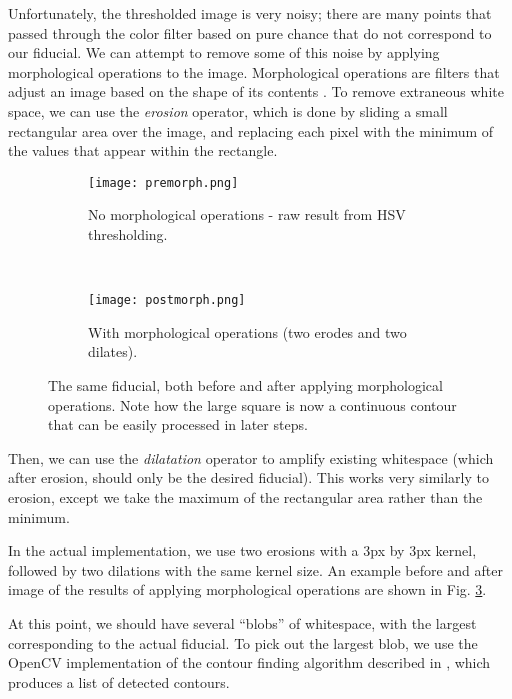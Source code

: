 \documentclass[letterpaper, 10 pt, conference]{ieeeconf}  %
\begin{document}
Unfortunately, the thresholded image is very noisy; there are many points that passed through the color filter based on pure chance that do not correspond to our fiducial. We can attempt to remove some of this noise by applying morphological operations to the image. Morphological operations are filters that adjust an image based on the shape of its contents \cite{OpenCV:morph}. To remove extraneous white space, we can use the \emph{erosion} operator, which is done by sliding a small rectangular area over the image, and replacing each pixel with the minimum of the values that appear within the rectangle. 

\begin{figure}[h]
        \centering
         \begin{subfigure}[b]{0.2\textwidth}
                \texttt{[image: premorph.png]}
                \caption{No morphological operations - raw result from HSV thresholding.}
                \label{fig:premorph}
        \end{subfigure}
        ~
        \begin{subfigure}[b]{0.2\textwidth}
                \texttt{[image: postmorph.png]}
                \caption{With morphological operations (two erodes and two dilates).}
                \label{fig:postmorph}
        \end{subfigure}
        \caption{The same fiducial, both before and after applying morphological operations. Note how the large square is now a continuous contour that can be easily processed in later steps.}
        \label{fig:morph}
\end{figure}

Then, we can use the \emph{dilatation} operator to amplify existing whitespace (which after erosion, should only be the desired fiducial). This works very similarly to erosion, except we take the maximum of the rectangular area rather than the minimum. 

In the actual implementation, we use two erosions with a 3px by 3px kernel, followed by two dilations with the same kernel size.  An example before and after image of the results of applying morphological operations are shown in Fig. \ref{fig:morph}.

At this point, we should have several ``blobs'' of whitespace, with the largest corresponding to the actual fiducial. To pick out the largest blob, we use the OpenCV implementation of the contour finding algorithm described in \cite{Suzuki:85}, which produces a list of detected contours. 
\end{document}
